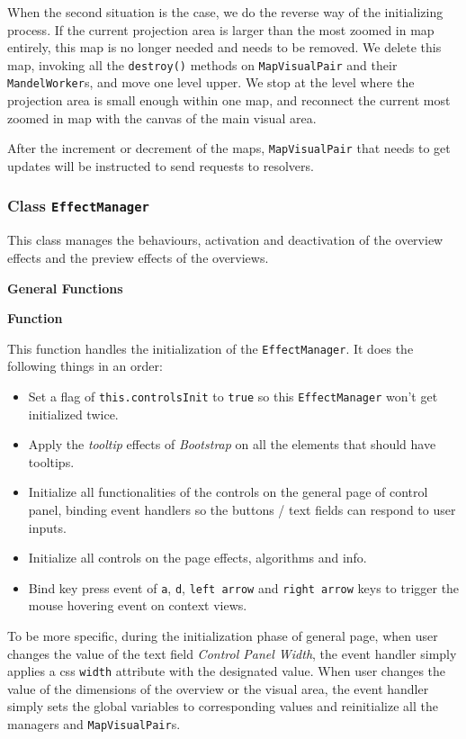 When the second situation is the case, we do the reverse way of the initializing process. If the current projection area is larger than the most zoomed in \gls{map} entirely, this \gls{map} is no longer needed and needs to be removed. We delete this \gls{map}, invoking all the \texttt{destroy()} methods on \texttt{MapVisualPair} and their \texttt{MandelWorker}s, and move one level upper. We stop at the level where the projection area is small enough within one \gls{map}, and reconnect the current most zoomed in map with the canvas of the main visual area.

After the increment or decrement of the \glspl{map}, \texttt{MapVisualPair} that needs to get updates will be instructed to send requests to resolvers.

\subsubsection{Class \texttt{EffectManager}}\label{chap4:effectmanager}

This class manages the behaviours, activation and deactivation of the overview effects and the preview effects of the overviews.

\textbf{General Functions}

\textbf{Function} 

This function handles the initialization of the \texttt{EffectManager}. It does the following things in an order:

\begin{itemize}
  \item Set a flag of \texttt{this.controlsInit} to \texttt{true} so this \texttt{EffectManager} won't get initialized twice.
  \item Apply the \emph{tooltip} effects of \emph{Bootstrap} on all the elements that should have tooltips.
  \item Initialize all functionalities of the controls on the general page of control panel, binding event handlers so the buttons / text fields can respond to user inputs.
  \item Initialize all controls on the page effects, algorithms and info.
  \item Bind key press event of \texttt{a}, \texttt{d}, \texttt{left arrow} and \texttt{right arrow} keys to trigger the mouse hovering event on context views.
\end{itemize}

To be more specific, during the initialization phase of general page, when user changes the value of the text field \emph{Control Panel Width}, the event handler simply applies a css \texttt{width} attribute with the designated value. When user changes the value of the dimensions of the overview or the visual area, the event handler simply sets the global variables to corresponding values and reinitialize all the managers and \texttt{MapVisualPair}s.

